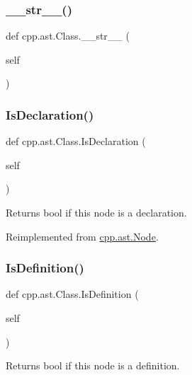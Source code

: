 \subsubsection{\texorpdfstring{\_\_str\_\_()}{\_\_str\_\_()}}
{\footnotesize\ttfamily def cpp.\+ast.\+Class.\+\_\+\+\_\+str\+\_\+\+\_\+ (\begin{DoxyParamCaption}\item[{}]{self }\end{DoxyParamCaption})}

\mbox{\label{classcpp_1_1ast_1_1_class_a4758bfb7c00410575932974e1ed8b7da}} 
\subsubsection{\texorpdfstring{IsDeclaration()}{IsDeclaration()}}
{\footnotesize\ttfamily def cpp.\+ast.\+Class.\+Is\+Declaration (\begin{DoxyParamCaption}\item[{}]{self }\end{DoxyParamCaption})}

\begin{DoxyVerb}Returns bool if this node is a declaration.\end{DoxyVerb}
 

Reimplemented from \mbox{\hyperlink{classcpp_1_1ast_1_1_node_ab3eca703a79fb65bc25dfbcb7547c79e}{cpp.\+ast.\+Node}}.

\mbox{\label{classcpp_1_1ast_1_1_class_ae6d2356f835d06d5109d9e4609d86780}} 
\subsubsection{\texorpdfstring{IsDefinition()}{IsDefinition()}}
{\footnotesize\ttfamily def cpp.\+ast.\+Class.\+Is\+Definition (\begin{DoxyParamCaption}\item[{}]{self }\end{DoxyParamCaption})}

\begin{DoxyVerb}Returns bool if this node is a definition.\end{DoxyVerb}
 

